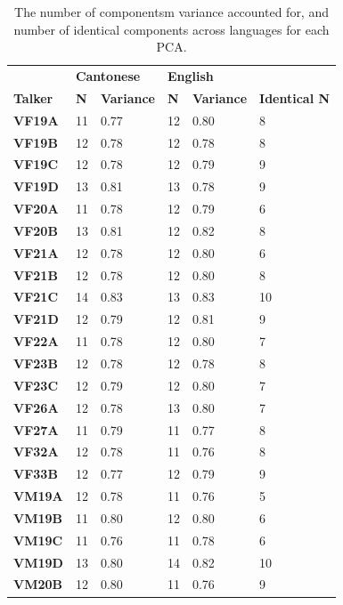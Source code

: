 \begin{table}[htbp]
    \caption{The number of componentsm variance accounted for, and number of identical components across languages for each PCA.}
\label{ch3:tab:componentcount}
\centering
{\footnotesize 
    \begin{tabular}{llllll}
    
    \toprule
     & \multicolumn{2}{l}{\textbf{Cantonese}} & \multicolumn{2}{l}{\textbf{English}} &  \\
    \textbf{Talker} & \textbf{N} & \textbf{Variance} & \textbf{N} & \textbf{Variance} & \textbf{Identical N} \\
    \midrule
    \textbf{VF19A} & 11 & 0.77 & 12 & 0.80 & 8 \\
    \textbf{VF19B} & 12 & 0.78 & 12 & 0.78 & 8 \\
    \textbf{VF19C} & 12 & 0.78 & 12 & 0.79 & 9 \\
    \textbf{VF19D} & 13 & 0.81 & 13 & 0.78 & 9 \\
    \textbf{VF20A} & 11 & 0.78 & 12 & 0.79 & 6 \\
    \textbf{VF20B} & 13 & 0.81 & 12 & 0.82 & 8 \\
    \textbf{VF21A} & 12 & 0.78 & 12 & 0.80 & 6 \\
    \textbf{VF21B} & 12 & 0.78 & 12 & 0.80 & 8 \\
    \textbf{VF21C} & 14 & 0.83 & 13 & 0.83 & 10 \\
    \textbf{VF21D} & 12 & 0.79 & 12 & 0.81 & 9 \\
    \textbf{VF22A} & 11 & 0.78 & 12 & 0.80 & 7 \\
    \textbf{VF23B} & 12 & 0.78 & 12 & 0.78 & 8 \\
    \textbf{VF23C} & 12 & 0.79 & 12 & 0.80 & 7 \\
    \textbf{VF26A} & 12 & 0.78 & 13 & 0.80 & 7 \\
    \textbf{VF27A} & 11 & 0.79 & 11 & 0.77 & 8 \\
    \textbf{VF32A} & 12 & 0.78 & 11 & 0.76 & 8 \\
    \textbf{VF33B} & 12 & 0.77 & 12 & 0.79 & 9 \\
    \textbf{VM19A} & 12 & 0.78 & 11 & 0.76 & 5 \\
    \textbf{VM19B} & 11 & 0.80 & 12 & 0.80 & 6 \\
    \textbf{VM19C} & 11 & 0.76 & 11 & 0.78 & 6 \\
    \textbf{VM19D} & 13 & 0.80 & 14 & 0.82 & 10 \\
    \textbf{VM20B} & 12 & 0.80 & 11 & 0.76 & 9 \\

\end{tabular}}
\end{table}
